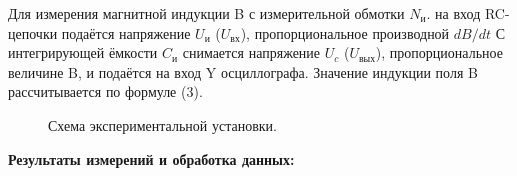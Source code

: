 \documentclass[a4paper, 12pt]{article}%
\begin{document}
	Для измерения магнитной индукции B с измерительной обмотки $N_{\text{и}}$.
	на вход RC-цепочки подаётся напряжение $U_{\text{и}}$ ($U_{\text{вх}}$), пропорциональное
	производной $dB/dt$ С интегрирующей ёмкости $C_{\text{и}}$ снимается напряжение $U_{c}$ ($U_{\text{вых}}$), пропорциональное величине B, и подаётся на вход Y
	осциллографа. Значение индукции поля B рассчитывается по формуле (3).
	
	\newpage
	
	\begin{figure}[h]
		\caption{Схема экспериментальной установки.}
	\end{figure}
	
	
	\textbf{Результаты измерений и обработка данных:}
	
\end{document}
